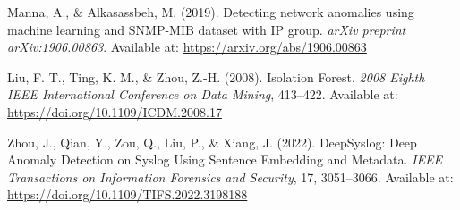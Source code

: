 \documentclass[11pt]{article}
\begin{document}
\begin{thebibliography}{9}
Manna, A., \& Alkasassbeh, M. (2019).
Detecting network anomalies using machine learning and SNMP-MIB dataset with IP group.
\textit{arXiv preprint arXiv:1906.00863}.
Available at: \href{https://arxiv.org/abs/1906.00863}{https://arxiv.org/abs/1906.00863}

Liu, F. T., Ting, K. M., \& Zhou, Z.-H. (2008).
Isolation Forest.
\textit{2008 Eighth IEEE International Conference on Data Mining}, 413--422.
Available at: \href{https://doi.org/10.1109/ICDM.2008.17}{https://doi.org/10.1109/ICDM.2008.17}

Zhou, J., Qian, Y., Zou, Q., Liu, P., \& Xiang, J. (2022).
DeepSyslog: Deep Anomaly Detection on Syslog Using Sentence Embedding and Metadata.
\textit{IEEE Transactions on Information Forensics and Security}, 17, 3051--3066.
Available at: \href{https://doi.org/10.1109/TIFS.2022.3198188}{https://doi.org/10.1109/TIFS.2022.3198188}

\end{thebibliography}
\end{document}
